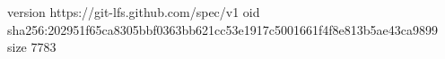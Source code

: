 version https://git-lfs.github.com/spec/v1
oid sha256:202951f65ca8305bbf0363bb621cc53e1917c5001661f4f8e813b5ae43ca9899
size 7783
